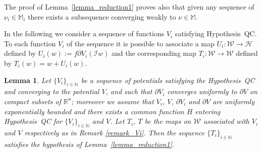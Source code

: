 \documentclass[a4paper,10pt]{article}
\newcommand{\assign}{:=}
\newtheorem{lemma}[theorem]{Lemma}
\begin{document}
\begin{remark}
  \label{remark_reduction1}The proof of Lemma~\ref{lemma_reduction1} proves
  also that given any sequence of $\nu_i \in \mathbb{M}_i$ there exists a
  subsequence converging weakly to $\nu \in \mathbb{M}$.
\end{remark}

\begin{remark}
  \label{remark_Vi}In the following we consider a sequence of functions $V_i$
  satisfying Hypothesis~QC. To each function $V_i$ of the sequence it is
  possible to associate a map $U_i : \mathcal{W} \rightarrow \mathcal{H}$
  defined by $U_i (w) \assign f \partial V_i (\mathcal{I} w)$ and the
  corresponding map $T_i : \mathcal{W} \rightarrow \mathcal{W}$ defined by
  $T_i (w) = w + U_i (w)$.
\end{remark}

\begin{lemma}
  \label{lemma_reduction2}Let $\{ V_i \}_{i \in \mathbb{N}}$ be a sequence of
  potentials satisfying the Hypothesis~QC and converging to the potential $V$,
  and such that $\partial V_i$ converges uniformly to $\partial V$ on compact
  subsets of $\mathbb{R}^n$; moreover we assume that $V_i$, $V$, $\partial
  V_i$ and $\partial V$ are uniformly exponentially bounded and there exists a
  common function $H$ entering Hypothesis~QC for $\{ V_i \}_{i \in
  \mathbb{N}}$ and $V$. Let $T_i$, $T$ be the maps on $\mathcal{W}$ associated
  with $V_i$ and $V$ respectively as in Remark \ref{remark_Vi}. Then the
  sequence $\{ T_i \}_{i \in \mathbb{N}}$ satisfies the hypothesis of
  Lemma~\ref{lemma_reduction1}. \ 
\end{lemma}
\end{document}
